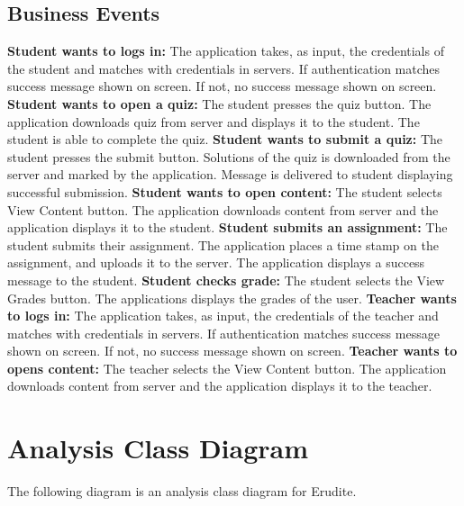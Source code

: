 \documentclass[]{article}
\begin{document}
\subsection{Business Events}
 \textbf{Student wants to logs in:} The application takes, as input, the credentials of the student and matches with credentials in servers. If authentication matches success message shown on screen. If not, no success message shown on screen. 
 \hfill\break\break 
 \textbf{Student wants to open a quiz:} The student presses the quiz button. The application downloads quiz from server and displays it to the student. The student is able to complete the quiz. 
 \hfill\break\break 
 \textbf{Student wants to submit a quiz:} The student presses the submit button. Solutions of the quiz is downloaded from the server and marked by the application. Message is delivered to student displaying successful submission. 
 \hfill\break\break 
 \textbf{Student wants to open content:}
The student selects View Content button. The application downloads content from server and the application displays it to the student.
\hfill\break\break 
\textbf{Student submits an assignment:} The student submits their assignment. The application places a time stamp on the assignment, and uploads it to the server. The application displays a success message to the student.
\hfill\break\break 
\textbf{Student checks grade:}
The student selects the View Grades button. The applications displays the grades of the user. 
\hfill\break\break
\textbf{Teacher wants to logs in:} The application takes, as input, the credentials of the teacher and matches with credentials in servers. If authentication matches success message shown on screen. If not, no success message shown on screen. 
\hfill\break\break
\textbf{Teacher wants to opens content:}
The teacher selects the View Content button. The application downloads content from server and the application displays it to the teacher.

 

\newpage

\section{Analysis Class Diagram}
\label{sec:analysis_class_diagram}
The following diagram is an analysis class diagram for Erudite.\\
\end{document}
